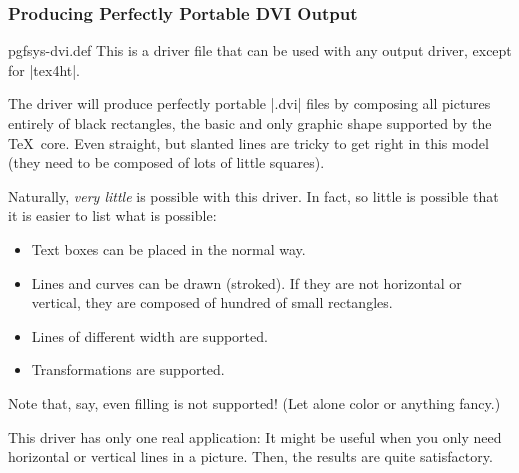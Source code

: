 \subsubsection{Producing Perfectly Portable DVI Output}

\begin{filedescription}{pgfsys-dvi.def}
  This is a driver file that can be used with any output driver,
  except for |tex4ht|.

  The driver will produce perfectly portable |.dvi| files by composing
  all pictures entirely of black rectangles, the basic and only graphic
  shape supported by the \TeX\ core. Even straight, but slanted lines
  are tricky to get right in this model (they need to be composed of
  lots of little squares).

  Naturally, \emph{very little} is possible with this driver. In fact,
  so little is possible that it is easier to list what is possible:
  \begin{itemize}
  \item Text boxes can be placed in the normal way.
  \item Lines and curves can be drawn (stroked). If they are not
    horizontal or vertical, they are composed of hundred of small
    rectangles.
  \item Lines of different width are supported.
  \item Transformations are supported.
  \end{itemize}
  Note that, say, even filling is not supported! (Let alone color or
  anything fancy.)

  This driver has only one real application: It might be useful when
  you only need horizontal or vertical lines in a picture. Then, the
  results are quite satisfactory.
\end{filedescription}
